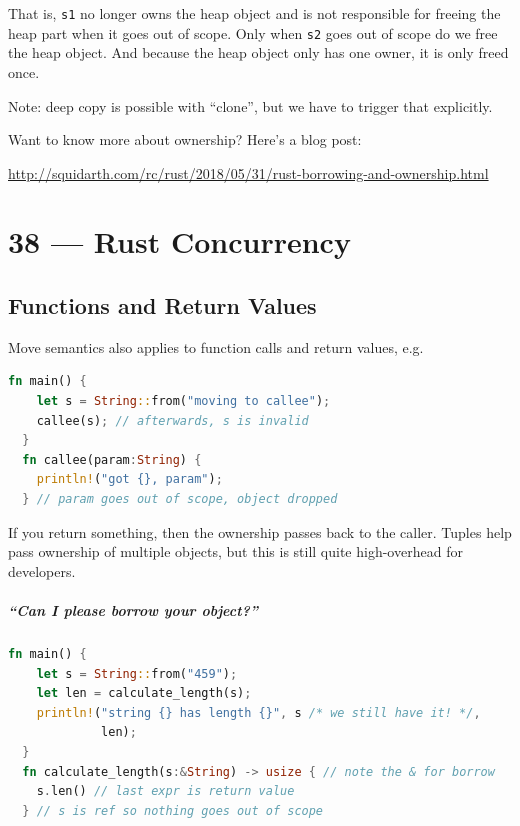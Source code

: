 \documentclass[a4paper]{report}
\begin{document}
That is, {\tt s1} no longer owns the heap object and is not responsible for freeing the heap part
when it goes out of scope. Only when {\tt s2} goes out of scope do we free the heap object.
And because the heap object only has one owner, it is only freed once.

Note: deep copy is possible with ``clone'', but we have to trigger that explicitly.

Want to know more about ownership? Here's a blog post:
\begin{center}
  \url{http://squidarth.com/rc/rust/2018/05/31/rust-borrowing-and-ownership.html}
\end{center}









\chapter*{38 --- Rust Concurrency}


\section*{Functions and Return Values}

Move semantics also applies to function calls and return values, e.g.
\begin{lstlisting}[language=Rust]
  fn main() {
    let s = String::from("moving to callee");
    callee(s); // afterwards, s is invalid
  }
  fn callee(param:String) {
    println!("got {}, param");
  } // param goes out of scope, object dropped
\end{lstlisting}
If you return something, then the ownership passes back to the caller.
Tuples help pass ownership of multiple objects, but this is still quite
high-overhead for developers.

\paragraph{``Can I please borrow your object?''}
\begin{lstlisting}[language=Rust]
  fn main() {
    let s = String::from("459");
    let len = calculate_length(s);
    println!("string {} has length {}", s /* we still have it! */,
             len);
  }
  fn calculate_length(s:&String) -> usize { // note the & for borrow
    s.len() // last expr is return value
  } // s is ref so nothing goes out of scope
\end{lstlisting}
  
\end{document}
